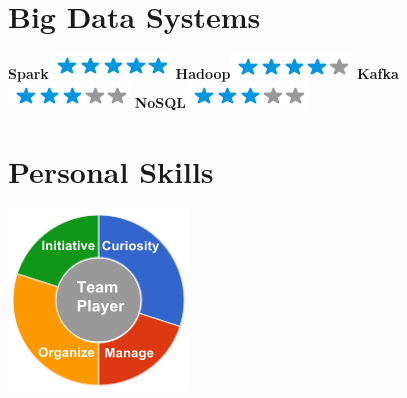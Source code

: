 \documentclass[]{friggeri-cv}
\begin{document}
\begin{aside}
		\section{Big Data Systems}
		\textbf{Spark}\includegraphics[scale=0.40]{img/5stars.png}
		\textbf{Hadoop}\includegraphics[scale=0.40]{img/4stars.png}
		\textbf{Kafka}\includegraphics[scale=0.40]{img/3stars.png}
		\textbf{NoSQL}\includegraphics[scale=0.40]{img/3stars.png}
		~
		\section{Personal Skills}
		\includegraphics[scale=0.62]{img/personal.png}
		~
	\end{aside}
	
\end{document}
